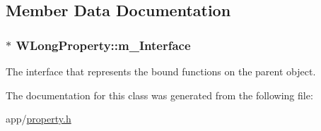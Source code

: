 \subsection{Member Data Documentation}
\hypertarget{class_w_long_property_aa2f15d5d8e88e1410664fec29b18dea6}{
\subsubsection[{m\-\_\-\-Interface}]{$\ast$ W\-Long\-Property\-::m\-\_\-\-Interface\hspace{0.3cm}{\ttfamily [protected]}}}\label{class_w_long_property_aa2f15d5d8e88e1410664fec29b18dea6}
The interface that represents the bound functions on the parent object. 

The documentation for this class was generated from the following file\-:\begin{DoxyCompactItemize}
\item 
app/\hyperlink{property_8h}{property.\-h}\end{DoxyCompactItemize}
